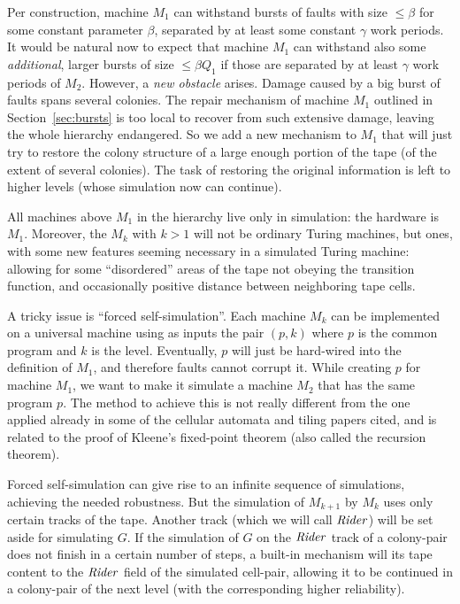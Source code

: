 \documentclass[11pt]{memoir}
\theoremstyle{definition} %
\renewcommand{\le}{\leq}
\newcommand{\fld}[1]{\ensuremath{\textit{#1\/}}}
\def\G{G} %
\newcommand{\Q}{Q} %
\newcommand{\Rider}{\fld{Rider}} %
\begin{document}
Per construction, machine \( M_{1} \) can withstand
bursts of faults with size  \( \le \beta \) for some constant parameter \( \beta \),
separated by at least some constant \( \gamma \) work periods.
It would be natural now to expect that machine
\( M_{1} \) can withstand also some \emph{additional}, larger bursts
of size \( \le \beta \Q_{1} \) if those are separated
by at least \( \gamma \) work periods of \( M_{2} \).
However, a \emph{new obstacle} arises.
Damage caused by a big burst of faults spans several colonies.
The repair mechanism of machine \( M_{1} \) outlined in Section~\ref{sec:bursts} 
is too local to recover from such extensive damage, leaving
the whole hierarchy endangered.
So we add a new mechanism to \( M_{1} \) that
will just try to restore the colony structure of a large enough portion of the
tape (of the extent of several colonies).
The task of restoring the original information is left to higher levels (whose simulation
now can continue).

All machines above \( M_{1} \) in the hierarchy live only in simulation: the hardware is \( M_{1} \).
Moreover, the \( M_{k} \) with \( k>1 \)
will not be ordinary Turing machines, but  ones,
with some new features seeming necessary in a simulated Turing machine:
allowing for some ``disordered'' areas of the tape not obeying the transition function,
and occasionally positive distance between neighboring tape cells.

A tricky issue is ``forced self-simulation''.
Each machine \( M_{k} \) can be implemented on a universal machine using as inputs
the pair \( (p,k) \) where \( p \) is the common program and \( k \) is the level.
Eventually, \( p \) will just be hard-wired into the definition of \( M_{1} \),
and therefore faults cannot corrupt it.
While creating \( p \) for machine \( M_{1} \),
we want to make it simulate a machine \( M_{2} \) that has the same program \( p \).
The method to achieve this is not really different from the one
applied already in some of the cellular automata and tiling papers cited, 
and is related to the proof of Kleene's fixed-point theorem (also called the recursion theorem).

Forced self-simulation can give rise to an infinite sequence of simulations, achieving
the needed robustness.
But the simulation of \( M_{k+1} \) by \( M_{k} \) uses only certain tracks of the tape.
Another track  (which we will call \( \Rider \)) will be set aside
for simulating \( \G \).
If the simulation of \( \G \) on the \( \Rider \) track of a colony-pair
does not finish in a certain number of steps,
a built-in mechanism will  its tape content to the \( \Rider \)
field of the simulated cell-pair, allowing it to be continued in a colony-pair of the next
level (with the corresponding higher reliability).
\end{document}
